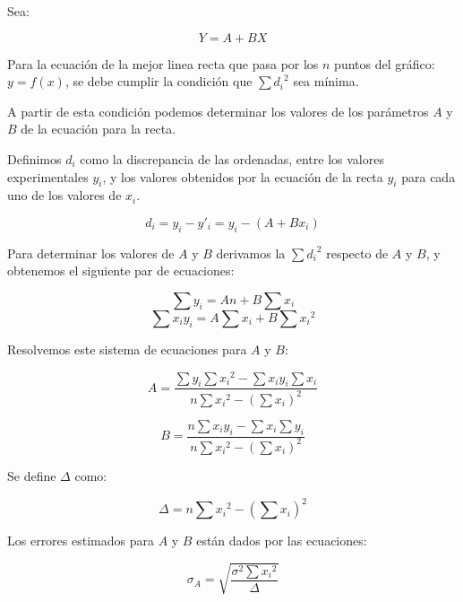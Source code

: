 \documentclass[letter,11pt]{article}
\begin{document}
Sea:

\begin{equation}
    Y = A + B X
\end{equation}

Para la ecuación de la mejor linea recta que pasa por los $n$ puntos del
gráfico: $y = f(x)$, se debe cumplir la condición que $\sum {d_i}^2$ sea mínima.

A partir de esta condición podemos determinar los valores de los parámetros $A$
y $B$ de la ecuación para la recta.

Definimos $d_i$ como la discrepancia de las ordenadas, entre los valores
experimentales $y_i$, y los valores obtenidos por la ecuación de la recta $y_i$
para cada uno de los valores de $x_i$.

\begin{equation}
    d_i = y_i - y'_i = y_i - ( A + B x_i )
\end{equation}

Para determinar los valores de $A$ y $B$ derivamos la $\sum {d_i}^2$ respecto de
$A$ y $B$, y obtenemos el siguiente par de ecuaciones:

\begin{equation}
    \sum y_i = A n + B \sum x_i
\end{equation}
\begin{equation}
    \sum x_i y_i = A \sum x_i + B \sum {x_i}^2
\end{equation}

Resolvemos este sistema de ecuaciones para $A$ y $B$:

\begin{equation}
    A = \frac{\sum y_i \sum {x_i}^2 - \sum x_i y_i \sum x_i}{n \sum {x_i}^2 - ({\sum x_i})^2}
\end{equation}

\begin{equation}
    B = \frac{n \sum {x_i}{y_i} - \sum x_i \sum y_i}{n \sum {x_i}^2 - ({\sum x_i})^2}
\end{equation}

Se define $\Delta$ como:

\begin{equation}
    \Delta = n \sum {x_i}^2 - ({\sum x_i})^2
\end{equation}

Los errores estimados para $A$ y $B$ están dados por las ecuaciones:

\begin{equation}
    \sigma_A = \sqrt{\frac{\sigma^2 \sum {x_i}^2}{\Delta}}
\end{equation}
\end{document}
